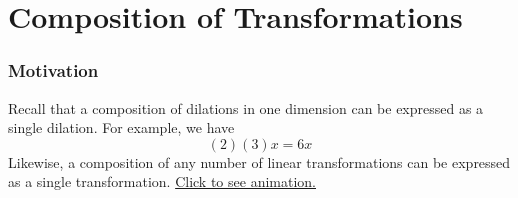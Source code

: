\section[Composition]{Composition of Transformations}
\frame{\sectionpage}


\begin{frame}
\frametitle{Motivation}
Recall that a composition of dilations in one dimension can be expressed as a single dilation. For example, we have
\[ (2)(3) x = 6x\]
Likewise, a composition of any number of linear transformations can be expressed as a single transformation. \href{https://youtu.be/XkY2DOUCWMU?t=269}{Click to see animation.}
\end{frame}

\begin{frame}
\end{frame}

\begin{frame}
\end{frame}

\begin{frame}
\end{frame}

